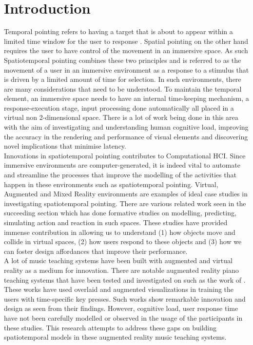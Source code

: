 \documentclass{article}
\begin{document}
\section{Introduction}
Temporal pointing refers to having a target that is about to appear within a limited time window for the user to response \cite{lee2016website}. Spatial pointing on the other hand requires the user to have control of the movement in an immersive space. As such Spatiotemporal pointing combines these two principles and is referred to as the movement of a user in an immersive environment as a response to a stimulus that is driven by a limited amount of time for selection. In such environments, there are many considerations that need to be understood. To maintain the temporal element, an immersive space needs to have an internal time-keeping mechanism, a response-execution stage, input processing done automatically all placed in a virtual non 2-dimensional space. There is a lot of work being done in this area with the aim of investigating and understanding human cognitive load, improving the accuracy in the rendering and performance of visual elements and discovering novel implications that minimise latency.\\

Innovations in spatiotemporal pointing contributes to Computational HCI. Since immersive environments are computer-generated, it is indeed vital to automate and streamline the processes that improve the modelling of the activities that happen in these environments such as spatiotemporal pointing. Virtual, Augmented and Mixed Reality environments are examples of ideal case studies in investigating spatiotemporal pointing. There are various related work seen in the succeeding section which has done formative studies on modelling, predicting, simulating action and reaction in such spaces. These studies have provided immense contribution in allowing us to understand (1) how objects move and collide in virtual spaces, (2) how users respond to these objects and (3) how we can foster design affordances that improve their performance. \\

A lot of music teaching systems have been built with augmented and virtual reality as a medium for innovation. There are notable augmented reality piano teaching systems that have been tested and investigated on such as the work of \cite{rogers2014piano, sun2018mr, birhanu2017keynvision}. These works have used overlaid and augmented visualizations in training the users with time-specific key presses. Such works show remarkable innovation and design as seen from their findings. However, cognitive load, user response time have not been carefully modelled or observed in the usage of the participants in these studies. This research attempts to address these gaps on building spatiotemporal models in these augmented reality music teaching systems. 
\end{document}
